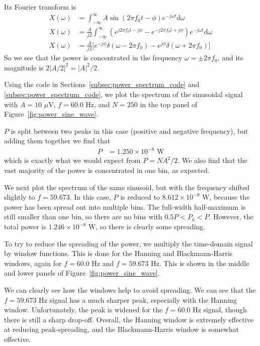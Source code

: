 \documentclass[twocolumn]{myarticle}
\renewcommand{\d}{\mathrm{d}}
\begin{document}
Its Fourier transform is
\begin{align}
    X(\omega) &= \int_{-\infty}^{\infty} A \sin(2 \pi f_0 t - \phi) e^{-j \omega t} \d \omega
    \\
    X(\omega) &= \frac{A}{j2} \int_{-\infty}^{\infty} \left( e^{j 2 \pi f_0 t - j \phi} - e^{-j 2 \pi f_0 t + j \phi} \right) e^{-j \omega t} \d \omega
    \\
    X(\omega) &= \frac{A}{j2} \Big[ e^{-j \phi} \delta(\omega - 2 \pi f_0) - e^{j \phi} \delta(\omega + 2 \pi f_0) \Big]
\end{align}
So we see that the power is concentrated in the frequency $ \omega = \pm 2 \pi f_0 $, and its magnitude is $ 2 \left| A/2 \right|^2 = |A|^2/2 $.

Using the code in Sections~\ref{subsec:power_spectrum_code} and \ref{subsec:power_spectrum_code}, we plot the spectrum of the sinusoidal signal with $ A = 10 $ $ \mu $V, $ f = 60.0 $ Hz, and $ N = 250 $ in the top panel of Figure~\ref{fig:power_sine_wave}.

$ P $ is split between two peaks in this case (positive and negative frequency), but adding them together we find that
\begin{align}
    P &= 1.250\times 10^{-8} \text{ W}
\end{align}
which is exactly what we would expect from $ P = N A^2/2 $.
We also find that the vast majority of the power is concentrated in one bin, as expected.

We next plot the spectrum of the same sinusoid, but with the frequency shifted slightly to $ f = 59.673 $.
In this case, $ P $ is reduced to $ 8.612 \times 10^{-9} $ W, because the power has been spread out into multiple bins.
The full-width half-maximum is still smaller than one bin, so there are no bins with $ 0.5 P < P_k < P $.
However, the total power is $ 1.246\times 10^{-8} $ W, so there is clearly some spreading.

To try to reduce the spreading of the power, we multiply the time-domain signal by window functions.
This is done for the Hanning and Blackmann-Harris windows, again for $ f = 60.0 $ Hz and $ f = 59.673 $ Hz.
This is shown in the middle and lower panels of Figure~\ref{fig:power_sine_wave}.

We can clearly see how the windows help to avoid spreading.
We can see that the $ f = 59.673 $ Hz signal has a much sharper peak, especially with the Hanning window.
Unfortunately, the peak is widened for the $ f = 60.0 $ Hz signal, though there is still a sharp drop-off.
Overall, the Hanning window is extremely effective at reducing peak-spreading, and the Blackmann-Harris window is somewhat effective.
\end{document}

